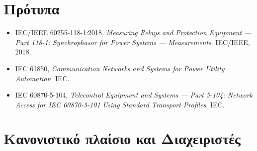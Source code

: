 \section{Πρότυπα}

\begin{itemize}
\item IEC/IEEE 60255-118-1:2018, \textit{Measuring Relays and Protection Equipment ---
      Part 118-1: Synchrophasor for Power Systems --- Measurements}. IEC/IEEE, 2018.
\item IEC 61850, \textit{Communication Networks and Systems for Power Utility Automation}. IEC.
\item IEC 60870-5-104, \textit{Telecontrol Equipment and Systems --- Part 5-104: Network
      Access for IEC 60870-5-101 Using Standard Transport Profiles}. IEC.
\end{itemize}

\section{Κανονιστικό πλαίσιο και Διαχειριστές}

